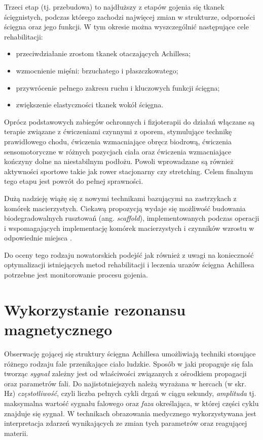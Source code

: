 Trzeci etap (tj. przebudowa) to najdłuższy z etapów gojenia się tkanek ścięgnistych, podczas którego zachodzi najwięcej zmian w strukturze, odporności ścięgna oraz jego funkcji. W tym okresie można wyszczególnić następujące cele rehabilitacji: 
\begin{itemize}[noitemsep,nolistsep]
	\item przeciwdziałanie zrostom tkanek otaczających Achillesa; 
	\item wzmocnienie mięśni: brzuchatego i płaszczkowatego; 
	\item przywrócenie pełnego zakresu ruchu i kluczowych funkcji ścięgna; 
	\item zwiększenie elastyczności tkanek wokół ścięgna.
\end{itemize}

Oprócz podstawowych zabiegów ochronnych i fizjoterapii do działań włączane \linebreak są terapie związane z ćwiczeniami czynnymi z oporem, stymulujące technikę prawidłowego chodu, ćwiczenia wzmacniające obręcz biodrową, ćwiczenia sensomotoryczne w różnych pozycjach ciała oraz ćwiczenia wzmacniające kończyny dolne na niestabilnym podłożu. Powoli wprowadzane są również aktywności sportowe takie jak rower stacjonarny czy stretching. Celem finalnym tego etapu jest powrót \linebreak do pełnej sprawności. 

Dużą nadzieję wiążę się z nowymi technikami bazującymi na zastrzykach z komórek macierzystych. Ciekawą propozycją wydaje się możliwość budowania biodegradowalnych rusztowań (ang. \textit{scaffold}), implementowanych podczas operacji i wspomagających implementację komórek macierzystych i czynników wzrostu w odpowiednie miejsca \cite{START}.

Do oceny tego rodzaju nowatorskich podejść jak również z uwagi na konieczność optymalizacji istniejących metod rehabilitacji i leczenia urazów ścięgna Achillesa potrzebne jest monitorowanie procesu gojenia. 

\section{Wykorzystanie rezonansu magnetycznego}
\label{RM}
Obserwację gojącej się struktury ścięgna Achillesa umożliwiają techniki stosujące różnego rodzaju fale przenikające ciało ludzkie. Sposób w jaki propaguje się fala tworząc \textit{sygnał} zależny jest od właściwości związanych z ośrodkiem propagacji oraz parametrów fali. Do najistotniejszych należą wyrażana w hercach (w skr. Hz) \textit{częstotliwość}, czyli liczba pełnych cykli drgań w ciągu sekundy, \textit{amplituda} tj. maksymalna wartość sygnału falowego oraz \textit{faza} określająca, w której części cyklu znajduje się sygnał. W technikach obrazowania medycznego wykorzystywana jest interpretacja zdarzeń wynikających ze zmian tych parametrów oraz reagującej materii.

